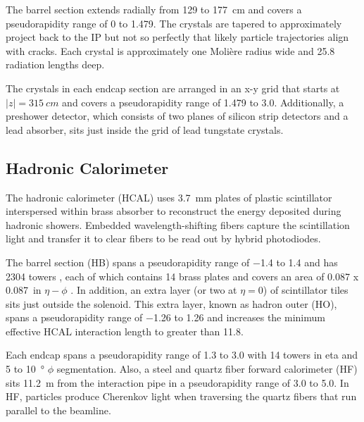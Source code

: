 \documentclass[12pt]{article}
\begin{document}
        The barrel section extends radially from \num{129} to \SI{177}{cm} and covers a pseudorapidity range of \num{0} to \num{1.479}. The crystals are tapered to approximately project back to the IP but not so perfectly that likely particle trajectories align with cracks. Each crystal is approximately one Moli\`ere radius wide and 25.8 radiation lengths deep.  

        The crystals in each endcap section are arranged in an x-y grid that starts at $\lvert z \rvert = \SI{315}{cm}$ and covers a pseudorapidity range of \num{1.479} to \num{3.0}. Additionally, a preshower detector, which consists of two planes of silicon strip detectors and a lead absorber, sits just inside the grid of lead tungstate crystals. 

    \subsection{Hadronic Calorimeter}
        The hadronic calorimeter (HCAL) uses \SI{3.7}{mm} plates of plastic scintillator interspersed within brass absorber to reconstruct the energy deposited during hadronic showers. Embedded wavelength-shifting fibers capture the scintillation light and transfer it to clear fibers to be read out by hybrid photodiodes\cite{cms_experiment, cms_tdr}.

        The barrel section (HB) spans a pseudorapidity range of \num{-1.4} to \num{1.4} and has \num{2304} towers , each of which contains \num{14}  brass plates and covers an area of \num{0.087} x \SI{0.087}{in} $\eta-\phi$ . In addition, an extra layer (or two at $\eta = \num{0}$) of scintillator tiles sits just outside the solenoid. This extra layer, known as hadron outer (HO), spans a pseudorapidity range of \num{-1.26} to \num{1.26} and increases the minimum effective HCAL interaction length to greater than \num{11.8}.

        Each endcap spans a pseudorapidity range of \num{1.3} to \num{3.0} with \num{14} towers in eta and \num{5} to \SI{10}{\degree} $\phi$ segmentation. Also, a steel and quartz fiber forward calorimeter (HF) sits \SI{11.2}{m} from the interaction pipe in a pseudorapidity range of \num{3.0} to \num{5.0}. In HF, particles produce Cherenkov light when traversing the quartz fibers that run parallel to the beamline. 
\end{document}
